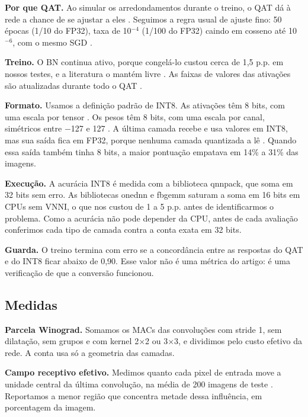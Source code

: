 \documentclass[conference]{IEEEtran}
\newcommand{\by}{\ensuremath{\times}}
\begin{document}
\textbf{Por que QAT.} Ao simular os arredondamentos durante o treino, o QAT dá à rede a chance de se ajustar a eles \cite{jacob2018quantization,nagel2021white}. Seguimos a regra usual de ajuste fino:
50 épocas (1/10 do FP32), taxa de 10$^{-4}$ (1/100 do FP32) caindo em cosseno até 10$^{-6}$, com o mesmo SGD \cite{wu2020integer}.

\textbf{Treino.} O BN continua ativo, porque congelá-lo custou cerca de 1,5 p.p. em nossos testes, e a literatura o mantém livre \cite{wu2020integer,nagel2021white}. As faixas de valores das ativações são
atualizadas durante todo o QAT \cite{jacob2018quantization}.

\textbf{Formato.} Usamos a definição padrão de INT8. As ativações têm 8 bits, com uma escala por tensor \cite{jacob2018quantization}. Os pesos têm 8 bits, com uma escala por canal, simétricos entre $-$127
e 127 \cite{wu2020integer}. A última camada recebe e usa valores em INT8, mas sua saída fica em FP32, porque nenhuma camada quantizada a lê \cite{wu2020integer}. Quando essa saída também tinha 8 bits, a maior
pontuação empatava em 14\% a 31\% das imagens.

\textbf{Execução.} A acurácia INT8 é medida com a biblioteca qnnpack, que soma em 32 bits sem erro. As bibliotecas onednn e fbgemm saturam a soma em 16 bits em CPUs sem VNNI, o que nos custou de 1 a 5 p.p. antes
de identificarmos o problema. Como a acurácia não pode depender da CPU, antes de cada avaliação conferimos cada tipo de camada contra a conta exata em 32 bits.

\textbf{Guarda.} O treino termina com erro se a concordância entre as respostas do QAT e do INT8 ficar abaixo de 0,90. Esse valor não é uma métrica do artigo: é uma verificação de que a conversão funcionou.

\subsection{Medidas}

\textbf{Parcela Winograd.} Somamos os MACs das convoluções com stride 1, sem dilatação, sem grupos e com kernel 2\by2 ou 3\by3, e dividimos pelo custo efetivo da rede. A conta usa só a geometria das camadas.

\textbf{Campo receptivo efetivo.} Medimos quanto cada pixel de entrada move a unidade central da última convolução, na média de 200 imagens de teste \cite{luo2016understanding}. Reportamos a menor região que
concentra metade dessa influência, em porcentagem da imagem.
\end{document}
